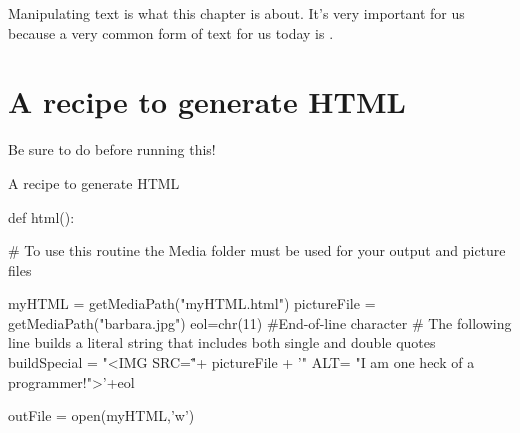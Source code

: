 

Manipulating text is what this chapter is about.  It's very important for us because a very common form of text for us today is .


\section{A recipe to generate HTML}

	Be sure to do  before running this!

\begin{recipe}{A recipe to generate HTML}
\begin{example}
def html():

    # To use this routine the Media folder must be used for your output and picture files

    myHTML =  getMediaPath("myHTML.html")
    pictureFile = getMediaPath("barbara.jpg") 
    eol=chr(11) #End-of-line character                 
    # The following line builds a literal string that includes both single and double quotes
    buildSpecial = "<IMG SRC=\""+ pictureFile + '" ALT= "I am one heck of a programmer!">'+eol 
   
    outFile = open(myHTML,'w')
      

\end{example}
\end{recipe}
